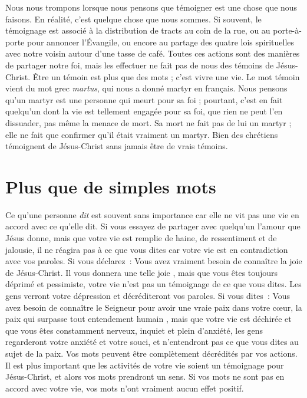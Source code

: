 Nous nous trompons lorsque nous pensons que témoigner
 est une chose que nous faisons.
 En réalité, c'est quelque chose que nous sommes.
 Si souvent, le témoignage est associé à la distribution de tracts
 au coin de la rue, ou au porte-à-porte pour annoncer l'Évangile,
 ou encore au partage des quatre lois spirituelles avec notre voisin
 autour d'une tasse de café.
 Toutes ces actions sont des manières de partager notre foi,
 mais les effectuer ne fait pas de nous des témoins de Jésus-Christ.
 Être un témoin est plus que des mots ; c'est vivre une vie.
 Le mot \og témoin \fg{} vient du mot grec \emph{martus},
 qui nous a donné martyr en français.
 Nous pensons qu'un martyr est une personne qui meurt pour sa foi ;
 pourtant, c'est en fait quelqu'un dont la vie est tellement engagée
 pour sa foi, que rien ne peut l'en dissuader, pas même la menace de mort.
 Sa mort ne fait pas de lui un martyr ; elle ne fait que confirmer
 qu'il était vraiment un martyr.
 Bien des chrétiens témoignent de Jésus-Christ
 sans jamais être de vrais témoins.

\section*{Plus que de simples mots}

Ce qu'une personne \emph{dit} est souvent sans importance
 car elle ne vit pas une vie en accord avec ce qu'elle dit.
 Si vous essayez de partager avec quelqu'un l'amour que Jésus donne,
 mais que votre vie est remplie de haine, de ressentiment et de jalousie,
 il ne réagira pas à ce que vous dites car votre vie est en contradiction
 avec vos paroles. Si vous déclarez~:
 \og Vous avez vraiment besoin de connaître la joie de Jésus-Christ.
 Il vous donnera une telle joie \fg{}, mais que vous êtes toujours déprimé
 et pessimiste, votre vie n'est pas un témoignage de ce que vous dites.
 Les gens verront votre dépression et décréditeront vos paroles.
 Si vous dites~: \og Vous avez besoin de connaître le Seigneur pour avoir
 une vraie paix dans votre cœur, la paix qui surpasse
 tout entendement humain \fg{}, mais que votre vie est déchirée
 et que vous êtes constamment nerveux, inquiet et plein d'anxiété,
 les gens regarderont votre anxiété et votre souci,
 et n'entendront pas ce que vous dites au sujet de la paix.
 Vos mots peuvent être complètement décrédités par vos actions.
 Il est plus important que les activités de votre vie soient
 un témoignage pour Jésus-Christ, et alors vos mots prendront un sens.
 Si vos mots ne sont pas en accord avec votre vie,
 vos mots n'ont vraiment aucun effet positif.

